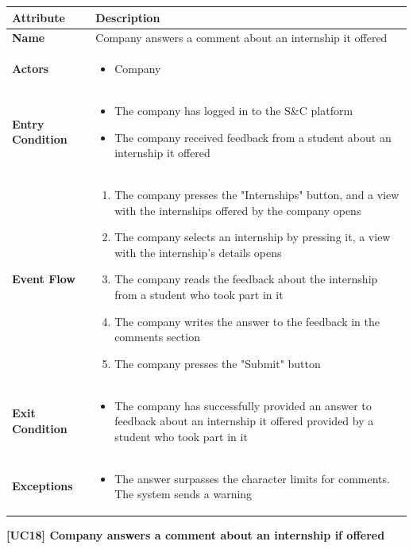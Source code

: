 \begin{center}
    
    \begin{tabular}{|p{3cm}|p{9cm}|}
    \hline
    \textbf{Attribute} & \textbf{Description} \\ \hline
    \textbf{Name} & Company answers a comment about an internship it offered \\ \hline
    \textbf{Actors} & 
    \begin{itemize}
        \item Company
    \end{itemize} \\ \hline
    \textbf{Entry Condition} & 
    \begin{itemize}
        \item The company has logged in to the S\&C platform
        \item The company received feedback from a student about an internship it offered
    \end{itemize}\\ \hline
    \textbf{Event Flow} & 
    \begin{enumerate}
        \item The company presses the "Internships" button, and a view with the internships offered by the company opens
        \item The company selects an internship by pressing it, a view with the internship's details opens
        \item The company reads the feedback about the internship from a student who took part in it
        \item The company writes the answer to the feedback in the comments section
        \item The company presses the "Submit" button
    \end{enumerate} \\ \hline
    \textbf{Exit Condition} & 
    \begin{itemize}
        \item The company has successfully provided an answer to feedback about an internship it offered provided by a student who took part in it
        \end{itemize}\\ \hline
    \textbf{Exceptions} & 
    \begin{itemize}
        \item The answer surpasses the character limits for comments. The system sends a warning
    \end{itemize}
    \\ \hline
    \end{tabular}
    \newline
    \newline
    \textbf{[UC18] Company answers a comment about an internship if offered}
    \newline
    \newline
    
\end{center}

